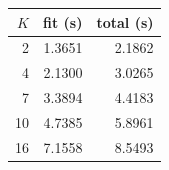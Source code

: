 \begin{tabular}{rrr}
\toprule
$K$ & fit (s) & total (s)\\
\midrule
2 & 1.3651 & 2.1862\\
4 & 2.1300 & 3.0265\\
7 & 3.3894 & 4.4183\\
10 & 4.7385 & 5.8961\\
16 & 7.1558 & 8.5493\\
\bottomrule
\end{tabular}
